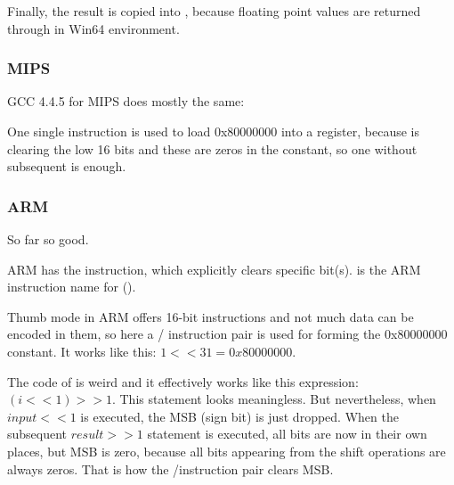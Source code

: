 Finally, the result is copied into , because floating point values are returned through  in Win64
environment.

\subsubsection{MIPS}

GCC 4.4.5 for MIPS does mostly the same:




One single \LUI instruction is used to load 0x80000000 into a register, because 
\LUI is clearing the low 16 bits and these are zeros in the constant, so one \LUI without subsequent \ORI is enough.

\subsubsection{ARM}

\myparagraph{\OptimizingKeilVI (\ARMMode)}



So far so good.

ARM has the \BIC instruction, which explicitly clears specific bit(s).
\EOR is the ARM instruction name for \XOR 
().

\myparagraph{\OptimizingKeilVI (\ThumbMode)}



Thumb mode in ARM offers 16-bit instructions and not much data can be encoded in them, so here a 
/ instruction pair is used for forming the 0x80000000 constant.
It works like this: $1<<31 = 0x80000000$.


The code of  is weird and it effectively works like this expression: $(i<<1)>>1$.
This statement looks meaningless.
But nevertheless, when $input<<1$ is executed, the \ac{MSB} (sign bit) is just dropped.
When the subsequent $result>>1$ statement is executed, all bits are now in their own places,
but \ac{MSB} is zero, because all  bits appearing from the shift operations are always zeros.
That is how the \LSLS/\LSRS instruction pair clears \ac{MSB}.

